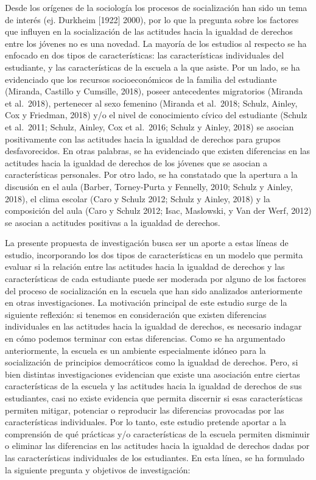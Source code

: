 \documentclass[12pt,twoside]{templates/facsothesis}
\begin{document}
Desde los orígenes de la sociología los procesos de socialización han sido un tema de interés (ej. Durkheim {[}1922{]} 2000), por lo que la pregunta sobre los factores que influyen en la socialización de las actitudes hacia la igualdad de derechos entre los jóvenes no es una novedad. La mayoría de los estudios al respecto se ha enfocado en dos tipos de características: las características individuales del estudiante, y las características de la escuela a la que asiste. Por un lado, se ha evidenciado que los recursos socioeconómicos de la familia del estudiante (Miranda, Castillo y Cumsille, 2018), poseer antecedentes migratorios (Miranda et al.~2018), pertenecer al sexo femenino (Miranda et al.~2018; Schulz, Ainley, Cox y Friedman, 2018) y/o el nivel de conocimiento cívico del estudiante (Schulz et al.~2011; Schulz, Ainley, Cox et al.~2016; Schulz y Ainley, 2018) se asocian positivamente con las actitudes hacia la igualdad de derechos para grupos desfavorecidos. En otras palabras, se ha evidenciado que existen diferencias en las actitudes hacia la igualdad de derechos de los jóvenes que se asocian a características personales. Por otro lado, se ha constatado que la apertura a la discusión en el aula (Barber, Torney-Purta y Fennelly, 2010; Schulz y Ainley, 2018), el clima escolar (Caro y Schulz 2012; Schulz y Ainley, 2018) y la composición del aula (Caro y Schulz 2012; Isac, Maslowski, y Van der Werf, 2012) se asocian a actitudes positivas a la igualdad de derechos.

La presente propuesta de investigación busca ser un aporte a estas líneas de estudio, incorporando los dos tipos de características en un modelo que permita evaluar si la relación entre las actitudes hacia la igualdad de derechos y las características de cada estudiante puede ser moderada por alguno de los factores del proceso de socialización en la escuela que han sido analizados anteriormente en otras investigaciones. La motivación principal de este estudio surge de la siguiente reflexión: si tenemos en consideración que existen diferencias individuales en las actitudes hacia la igualdad de derechos, es necesario indagar en cómo podemos terminar con estas diferencias. Como se ha argumentado anteriormente, la escuela es un ambiente especialmente idóneo para la socialización de principios democráticos como la igualdad de derechos. Pero, si bien distintas investigaciones evidencian que existe una asociación entre ciertas características de la escuela y las actitudes hacia la igualdad de derechos de sus estudiantes, casi no existe evidencia que permita discernir si esas características permiten mitigar, potenciar o reproducir las diferencias provocadas por las características individuales. Por lo tanto, este estudio pretende aportar a la comprensión de qué prácticas y/o características de la escuela permiten disminuir o eliminar las diferencias en las actitudes hacia la igualdad de derechos dadas por las características individuales de los estudiantes. En esta línea, se ha formulado la siguiente pregunta y objetivos de investigación:
\end{document}
